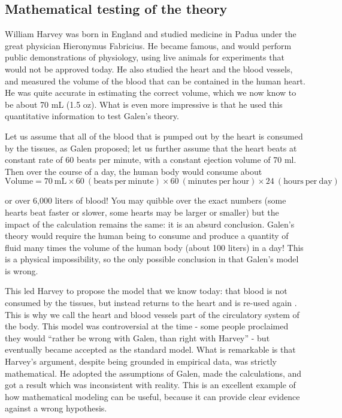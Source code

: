 \documentclass[
  letterpaper,
  DIV=11,
  numbers=noendperiod]{scrreprt}
\begin{document}
\hypertarget{mathematical-testing-of-the-theory}{%
\subsection{Mathematical testing of the
theory}\label{mathematical-testing-of-the-theory}}

William Harvey  was born in England and studied
medicine in Padua under the great physician Hieronymus Fabricius. He
became famous, and would perform public demonstrations of physiology,
using live animals for experiments that would not be approved today. He
also studied the heart and the blood vessels, and measured the volume of
the blood that can be contained in the human heart. He was quite
accurate in estimating the correct volume, which we now know to be about
70 mL (1.5 oz). What is even more impressive is that he used this
quantitative information to test Galen's theory.

Let us assume that all of the blood that is pumped out by the heart is
consumed by the tissues, as Galen proposed; let us further assume that
the heart beats at constant rate of 60 beats per minute, with a constant
ejection volume of 70 ml. Then over the course of a day, the human body
would consume about
\[\mathrm{Volume} = 70 \ \mathrm {mL} \times 60 \ \mathrm {(beats \ per \ minute)} \times 60 \ \mathrm {(minutes \ per \ hour)}  \times 24 \ \mathrm {(hours \ per \ day)}\]

or over 6,000 liters of blood! You may quibble over the exact numbers
(some hearts beat faster or slower, some hearts may be larger or
smaller) but the impact of the calculation remains the same: it is an
absurd conclusion. Galen's theory would require the human being to
consume and produce a quantity of fluid many times the volume of the
human body (about 100 liters) in a day! This is a physical
impossibility, so the only possible conclusion in that Galen's model is
wrong.

This led Harvey to propose the model that
we know today: that blood is not consumed by the tissues, but instead
returns to the heart and is re-used again \cite{schultz_william_2002}.
This is why we call the heart and blood vessels part of the circulatory
system of the body. This model was controversial at the time - some
people proclaimed they would ``rather be wrong with Galen, than right
with Harvey'' - but eventually became accepted as the standard model.
What is remarkable is that Harvey's argument, despite being grounded in
empirical data, was strictly mathematical. He adopted the assumptions of
Galen, made the calculations, and got a result which was inconsistent
with reality. This is an excellent example of how mathematical modeling
can be useful, because it can provide clear evidence against a wrong
hypothesis.
\end{document}

